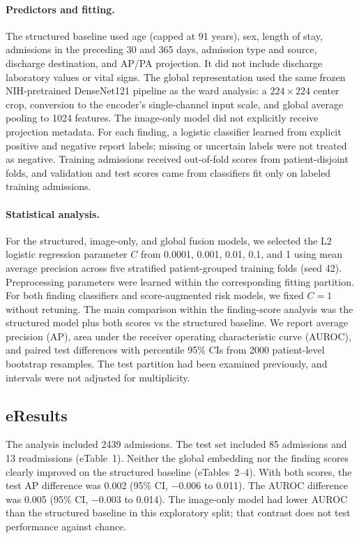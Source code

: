 \paragraph{Predictors and fitting.} The structured baseline used age (capped at 91 years), sex, length of stay, admissions in the preceding 30 and 365 days, admission type and source, discharge destination, and AP/PA projection. It did not include discharge laboratory values or vital signs. The global representation used the same frozen NIH-pretrained DenseNet121 pipeline as the ward analysis: a $224\times224$ center crop, conversion to the encoder's single-channel input scale, and global average pooling to 1024 features. The image-only model did not explicitly receive projection metadata. For each finding, a logistic classifier learned from explicit positive and negative report labels; missing or uncertain labels were not treated as negative. Training admissions received out-of-fold scores from patient-disjoint folds, and validation and test scores came from classifiers fit only on labeled training admissions.

\paragraph{Statistical analysis.} For the structured, image-only, and global fusion models, we selected the L2 logistic regression parameter $C$ from 0.0001, 0.001, 0.01, 0.1, and 1 using mean average precision across five stratified patient-grouped training folds (seed 42). Preprocessing parameters were learned within the corresponding fitting partition. For both finding classifiers and score-augmented risk models, we fixed $C=1$ without retuning. The main comparison within the finding-score analysis was the structured model plus both scores vs the structured baseline. We report average precision (AP), area under the receiver operating characteristic curve (AUROC), and paired test differences with percentile 95\% CIs from 2000 patient-level bootstrap resamples. The test partition had been examined previously, and intervals were not adjusted for multiplicity.

\subsection*{eResults}
The analysis included 2439 admissions. The test set included 85 admissions and 13 readmissions (eTable~1). Neither the global embedding nor the finding scores clearly improved on the structured baseline (eTables~2--4). With both scores, the test AP difference was 0.002 (95\% CI, $-0.006$ to 0.011). The AUROC difference was 0.005 (95\% CI, $-0.003$ to 0.014). The image-only model had lower AUROC than the structured baseline in this exploratory split; that contrast does not test performance against chance.

